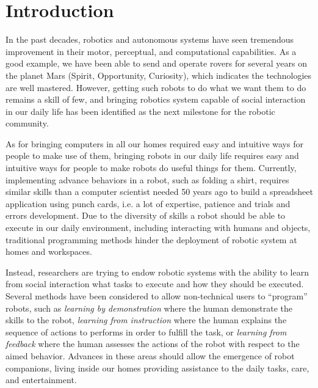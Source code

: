 
\chapter{Introduction}
\label{chapter:introduction}
\minitoc


In the past decades, robotics and autonomous systems have seen tremendous improvement in their motor, perceptual, and computational capabilities. As a good example, we have been able to send and operate rovers for several years on the planet Mars (Spirit, Opportunity, Curiosity), which indicates the technologies are well mastered. However, getting such robots to do what we want them to do remains a skill of few, and bringing robotics system capable of social interaction in our daily life has been identified as the next milestone for the robotic community.

As for bringing computers in all our homes required easy and intuitive ways for people to make use of them, bringing robots in our daily life requires easy and intuitive ways for people to make robots do useful things for them. Currently, implementing advance behaviors in a robot, such as folding a shirt, requires similar skills than a computer scientist needed 50 years ago to build a spreadsheet application using punch cards, i.e. a lot of expertise, patience and trials and errors development. Due to the diversity of skills a robot should be able to execute in our daily environment, including interacting with humans and objects, traditional programming methods hinder the deployment of robotic system at homes and workspaces.

Instead, researchers are trying to endow robotic systems with the ability to learn from social interaction what tasks to execute and how they should be executed. Several methods have been considered to allow non-technical users to ``program'' robots, such as \emph{learning by demonstration} where the human demonstrate the skills to the robot, \emph{learning from instruction} where the human explains the sequence of actions to performs in order to fulfill the task, or \emph{learning from feedback} where the human assesses the actions of the robot with respect to the aimed behavior. Advances in these areas should allow the emergence of robot companions, living inside our homes providing assistance to the daily tasks, care, and entertainment. 

